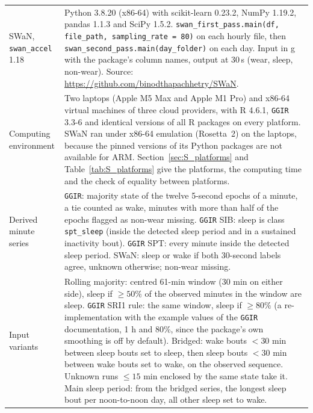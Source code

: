 \documentclass[12pt]{article}
\begin{document}
{\begin{longtable}{p{}>{\raggedright\arraybackslash}p{}}
SWaN, \texttt{swan\_accel} 1.18 & Python 3.8.20 (x86-64) with scikit-learn 0.23.2, NumPy 1.19.2, pandas 1.1.3 and SciPy 1.5.2. \texttt{swan\_first\_pass.main(df, file\_path, sampling\_rate = 80)} on each hourly file, then \texttt{swan\_second\_pass.main(day\_folder)} on each day. Input in g with the package's column names, output at 30\,s (wear, sleep, non-wear). Source: \url{https://github.com/binodthapachhetry/SWaN}. \\
Computing environment & Two laptops (Apple M5 Max and Apple M1 Pro) and x86-64 virtual machines of three cloud providers, with R 4.6.1, \texttt{GGIR} 3.3-6 and identical versions of all R packages on every platform. SWaN ran under x86-64 emulation (Rosetta~2) on the laptops, because the pinned versions of its Python packages are not available for ARM. Section~\ref{sec:S_platforms} and Table~\ref{tab:S_platforms} give the platforms, the computing time and the check of equality between platforms. \\
Derived minute series & \texttt{GGIR}: majority state of the twelve 5-second epochs of a minute, a tie counted as wake, minutes with more than half of the epochs flagged as non-wear missing. \texttt{GGIR} SIB: sleep is class \texttt{spt\_sleep} (inside the detected sleep period and in a sustained inactivity bout). \texttt{GGIR} SPT: every minute inside the detected sleep period. SWaN: sleep or wake if both 30-second labels agree, unknown otherwise; non-wear missing. \\
Input variants & Rolling majority: centred 61-min window (30 min on either side), sleep if $\geq 50\%$ of the observed minutes in the window are sleep. \texttt{GGIR} SRI1 rule: the same window, sleep if $\geq 80\%$ (a re-implementation with the example values of the \texttt{GGIR} documentation, 1 h and 80\%, since the package's own smoothing is off by default). Bridged: wake bouts $<30$ min between sleep bouts set to sleep, then sleep bouts $<30$ min between wake bouts set to wake, on the observed sequence. Unknown runs $\leq 15$ min enclosed by the same state take it. Main sleep period: from the bridged series, the longest sleep bout per noon-to-noon day, all other sleep set to wake. \\
\end{longtable}}
\end{document}
